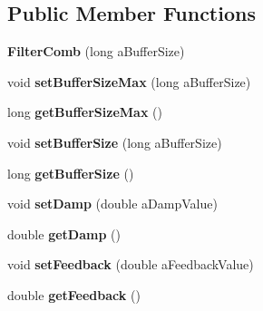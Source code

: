 \subsection*{Public Member Functions}
\begin{DoxyCompactItemize}
\item 
\hypertarget{class_filter_comb_afe69ff10a4879955dd26d86a6cf65696}{{\bfseries Filter\-Comb} (long a\-Buffer\-Size)}\label{class_filter_comb_afe69ff10a4879955dd26d86a6cf65696}

\item 
\hypertarget{class_filter_comb_af10d07c5f9b2dec74fa59f8545dadae7}{void {\bfseries set\-Buffer\-Size\-Max} (long a\-Buffer\-Size)}\label{class_filter_comb_af10d07c5f9b2dec74fa59f8545dadae7}

\item 
\hypertarget{class_filter_comb_a515055889a74f1ba7394508e81321b95}{long {\bfseries get\-Buffer\-Size\-Max} ()}\label{class_filter_comb_a515055889a74f1ba7394508e81321b95}

\item 
\hypertarget{class_filter_comb_a4b1a72c93e8cdde555a7d99aa4af3d74}{void {\bfseries set\-Buffer\-Size} (long a\-Buffer\-Size)}\label{class_filter_comb_a4b1a72c93e8cdde555a7d99aa4af3d74}

\item 
\hypertarget{class_filter_comb_ac8fa5e763c12687dd7acdb089c0c538f}{long {\bfseries get\-Buffer\-Size} ()}\label{class_filter_comb_ac8fa5e763c12687dd7acdb089c0c538f}

\item 
\hypertarget{class_filter_comb_ad98f3eed54312e7221c6d186fee53d2c}{void {\bfseries set\-Damp} (double a\-Damp\-Value)}\label{class_filter_comb_ad98f3eed54312e7221c6d186fee53d2c}

\item 
\hypertarget{class_filter_comb_aa554328928b1fa7bb8dcf9ca02ddf178}{double {\bfseries get\-Damp} ()}\label{class_filter_comb_aa554328928b1fa7bb8dcf9ca02ddf178}

\item 
\hypertarget{class_filter_comb_a3fa50be9caba717e072a3cd917d18255}{void {\bfseries set\-Feedback} (double a\-Feedback\-Value)}\label{class_filter_comb_a3fa50be9caba717e072a3cd917d18255}

\item 
\hypertarget{class_filter_comb_a581a46b00fc03391075846764dc20cd8}{double {\bfseries get\-Feedback} ()}\label{class_filter_comb_a581a46b00fc03391075846764dc20cd8}


\end{DoxyCompactItemize}
